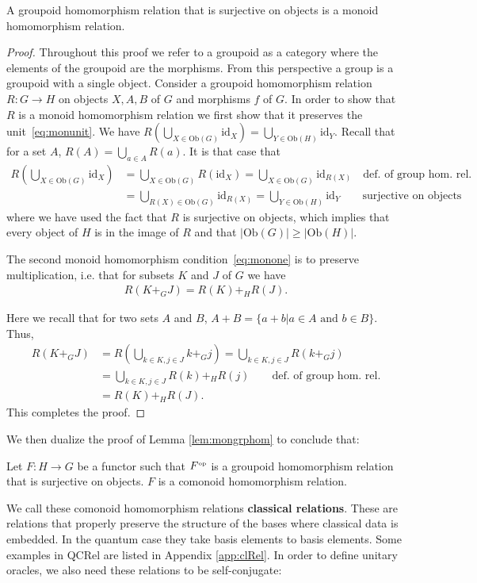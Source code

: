 \begin{lemma}
\label{lem:mongrphom}
A groupoid homomorphism relation that is surjective on objects is a monoid homomorphism relation.
\end{lemma}
\begin{proof}
Throughout this proof we refer to a groupoid as a category where the elements of the groupoid are the morphisms.  From this perspective a group is a groupoid with a single object. Consider a groupoid homomorphism relation $R:G\to H$ on objects $X,A,B$ of $G$ and morphisms $f$ of $G$.
In order to show that $R$ is a monoid homomorphism relation we first show that it preserves the unit~\eqref{eq:monunit}. We have $R(\bigcup_{X\in\mbox{Ob}(G)} \mbox{id}_X) = \bigcup_{Y\in\mbox{Ob}(H)} \mbox{id}_Y$. Recall that for a set $A$,  $R(A)=\bigcup_{a\in A} R(a)$. It is that case that
\begin{align}
R(\bigcup\nolimits_{X\in\mbox{Ob}(G)} \mbox{id}_X) &= \bigcup\nolimits_{X\in\mbox{Ob}(G)}R(\mbox{id}_X) = \bigcup\nolimits_{X\in\mbox{Ob}(G)}\mbox{id}_{R(X)} \quad \mbox{def. of group hom. rel.} \\
&= \bigcup\nolimits_{R(X)\in\mbox{Ob}(G)}\mbox{id}_{R(X)} = \bigcup\nolimits_{{Y\in\mbox{Ob}(H)}}\mbox{id}_{Y} \qquad \mbox{surjective on objects}
\end{align}
where we have used the fact that $R$ is surjective on objects, which implies that every object of $H$ is in the image of $R$ and that $|\mbox{Ob}(G)|\ge|\mbox{Ob}(H)|$.

The second monoid homomorphism condition~\eqref{eq:monone} is to preserve multiplication, i.e. that for subsets $K$ and $J$ of $G$ we have
\begin{align}
R(K+_GJ)=R(K)+_HR(J).
\end{align}

\noindent Here we recall that for two sets $A$ and $B$, $A+B=\{a + b | a \in A\mbox{ and } b \in B\}$. Thus,
\begin{align}
R(K+_GJ) &= R(\bigcup\nolimits_{k\in K,j\in J}k+_Gj) = \bigcup\nolimits_{k\in K,j\in J}R(k+_Gj) \\
&= \bigcup\nolimits_{k\in K,j\in J}R(k)+_HR(j) \qquad \mbox{def. of group hom. rel.}\\
&= R(K)+_HR(J).
\end{align}
This completes the proof.
\end{proof}

We then dualize the proof of Lemma \ref{lem:mongrphom} to conclude that:
\begin{lemma}
\label{lem:classicalRelation}
Let $F:H\to G$ be a functor such that $F^{\mbox{\tiny op}}$ is a groupoid homomorphism relation that is surjective on objects. $F$ is a comonoid homomorphism relation.
\end{lemma}
\noindent We call these comonoid homomorphism relations \textbf{classical relations}. These are relations that properly preserve the structure of the bases where classical data is embedded.  In the quantum case they take basis elements to basis elements. Some examples in QCRel are listed in Appendix \ref{app:clRel}. In order to define unitary oracles, we also need these relations to be self-conjugate:

